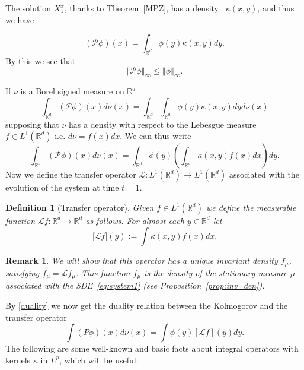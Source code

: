\documentclass{amsart}
\newtheorem{definition}[theorem]{Definition}
\newtheorem{remark}[theorem]{Remark}
\newcommand\cL{{\mathcal L}}
\newcommand\cP{{\mathcal P}}
\newcommand{\norm}[1]{\left\Vert#1\right\Vert}
\begin{document}
The solution $X_1^x$, thanks to Theorem~\ref{MPZ}, has a density \ $\kappa(x,y)$, and thus we have
 
\begin{equation*}
(\cP\phi )(x)=\int_{\mathbb{R}^{d}}\phi (y)\kappa(x,y)dy.
\end{equation*}%
By this we see that 
\begin{equation}
\norm{ \cP\phi }_{\infty }\leq \norm{ \phi}_{\infty }.  \label{inft}
\end{equation}

 If $\nu $ is a Borel signed measure on $%
\mathbb{R}^{d}$ 
\begin{equation*}
\int_{\mathbb{R}^{d}}(\cP\phi )(x) d\nu(x) = \int_{\mathbb{R}^{d}}\int_{\mathbb{R%
}^{d}}\phi (y)\kappa(x,y)dyd\nu (x)
\end{equation*}%
supposing that $\nu $ has a density with respect to the Lebesgue measure {%
 $f\in L^{1}(\mathbb{R}^{d})$ i.e. $d\nu =f(x)dx$. We can thus
write 
\begin{equation}
\int_{\mathbb{R}^{d}}(\cP\phi )(x)d\nu (x)=\int_{\mathbb{R}^{d}}\phi (y)\left(
\int_{\mathbb{R}^{d}}\kappa(x,y)f(x)dx\right) dy.  \label{duality}
\end{equation}%
}
Now we define the transfer operator $\cL:L^{1}(\mathbb{R}^{d})\rightarrow
L^{1}(\mathbb{R}^{d})$ associated with the evolution of the system at time $t=1$.

\begin{definition}[Transfer operator]\label{def:to}
Given $f\in L^{1}(\mathbb{R}^{d})$ we define the measurable function $\cL f:%
\mathbb{R}^{d}\rightarrow \mathbb{R}^{d}$ as follows. For almost each $y\in 
\mathbb{R}^{d}$ let 
\begin{equation}
\lbrack \cL f](y):=\int \kappa(x,y)f(x)dx.  \label{eq:stoctransfer}
\end{equation}
\end{definition}

\begin{remark}
We will show that this operator has a unique invariant density \( f_\mu \), satisfying \( f_\mu = \mathcal{L} f_\mu \). This function \( f_\mu \) is the density of the stationary measure \( \mu \) associated with the SDE~\eqref{eq:system1} (see Proposition~\ref{prop:inv_den}).

\end{remark}

By \eqref{duality} we now get the duality relation between the Kolmogorov
and the transfer operator 
\begin{equation}
\int (P\phi )(x)d\nu (x)=\int \phi (y)[\cL f](y)dy.  \label{eq:stocduality}
\end{equation}
The following are some well-known and basic facts about integral operators with
kernels $\kappa$ in $L^{p}$, which will be useful:\\
\end{document}
